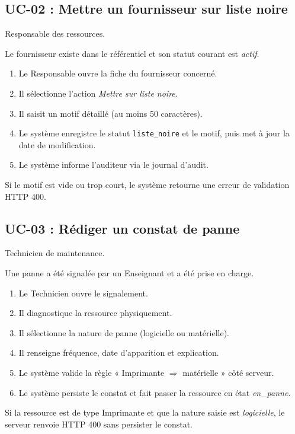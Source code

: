 \documentclass[a4paper,11pt,openany]{report}
\begin{document}
\subsection{UC-02 : Mettre un fournisseur sur liste noire}
\begin{description}[leftmargin=*]
  \item[Acteur principal] Responsable des ressources.
  \item[Précondition] Le fournisseur existe dans le référentiel
    et son statut courant est \emph{actif}.
  \item[Scénario nominal]
    \begin{enumerate}
      \item Le Responsable ouvre la fiche du fournisseur
        concerné.
      \item Il sélectionne l'action \emph{Mettre sur liste
        noire}.
      \item Il saisit un motif détaillé (au moins 50 caractères).
      \item Le système enregistre le statut \texttt{liste\_noire}
        et le motif, puis met à jour la date de modification.
      \item Le système informe l'auditeur via le journal
        d'audit.
    \end{enumerate}
  \item[Scénario alternatif] Si le motif est vide ou trop court,
    le système retourne une erreur de validation HTTP 400.
\end{description}

\subsection{UC-03 : Rédiger un constat de panne}
\begin{description}[leftmargin=*]
  \item[Acteur principal] Technicien de maintenance.
  \item[Précondition] Une panne a été signalée par un
    Enseignant et a été prise en charge.
  \item[Scénario nominal]
    \begin{enumerate}
      \item Le Technicien ouvre le signalement.
      \item Il diagnostique la ressource physiquement.
      \item Il sélectionne la nature de panne (logicielle ou
        matérielle).
      \item Il renseigne fréquence, date d'apparition et
        explication.
      \item Le système valide la règle « Imprimante $\Rightarrow$
        matérielle » côté serveur.
      \item Le système persiste le constat et fait passer la
        ressource en état \emph{en\_panne}.
    \end{enumerate}
  \item[Scénario alternatif] Si la ressource est de type
    Imprimante et que la nature saisie est \emph{logicielle}, le
    serveur renvoie HTTP 400 sans persister le constat.
\end{description}
\end{document}
